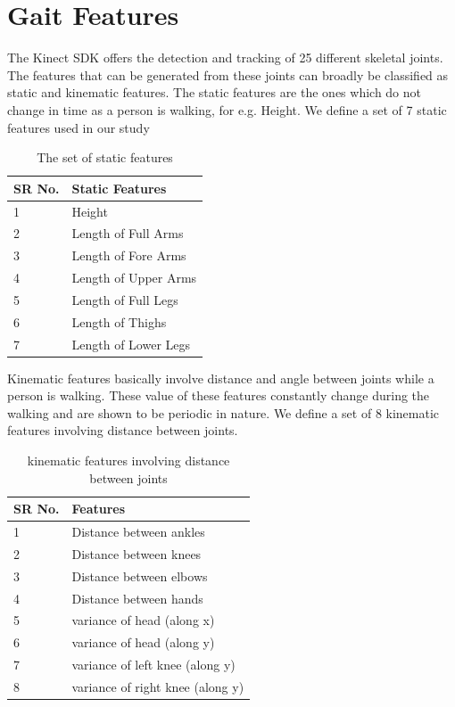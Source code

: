 \newpage
\section{Gait Features} \label{Gait Features } 
\noindent The Kinect SDK offers the detection and tracking of 25 different skeletal joints. The features that can be generated from these joints can broadly be classified as static and kinematic features.
The static features are the ones which do not change in time as a person is walking, for e.g. Height. We define a set of 7 static features used in our study
\def\arraystretch{1.3}
\begin{table}[h]
\centering
\begin{tabular}{| p{2cm} | |p{5cm}|}
 \hline
\cellcolor{pink} SR No. & \cellcolor{pink} Static Features  \\ \hline
1 & Height \\ \hline
2 & Length of Full Arms \\ \hline
3 & Length of Fore Arms \\\hline
4 & Length of Upper Arms \\ \hline
5 & Length of Full Legs \\ \hline
6 & Length of Thighs \\\hline
7 & Length of Lower Legs \\ \hline
\end{tabular}
\caption{The set of static features}
\end{table}

\noindent Kinematic features basically involve distance and angle between joints while a person is walking. These value of these features constantly change during the walking and are shown to be periodic in nature. We define a set of 8 kinematic features involving distance between joints.
\def\arraystretch{1.3}
\begin{table}
\centering
\begin{tabular}{| p{2cm} | |p{6cm}|}
 \hline
\cellcolor{pink} SR No. & \cellcolor{pink} Features  \\ \hline
1 & Distance between ankles \\ \hline
2 & Distance between knees \\ \hline
3 & Distance between elbows \\\hline
4 & Distance between hands \\ \hline
5 & variance of head (along x) \\ \hline
6 & variance of head (along y) \\\hline
7 & variance of left knee (along y) \\ \hline
8 & variance of right knee (along y) \\ \hline
\end{tabular}
\caption{ kinematic features involving distance between joints}
\end{table}

